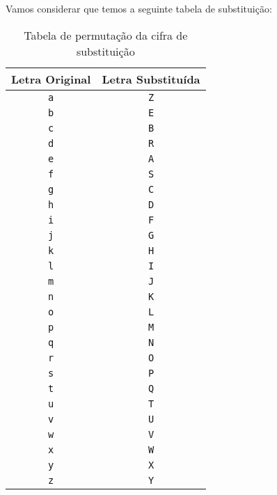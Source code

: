 \begin{example}

Vamos considerar que temos a seguinte tabela de substituição:
  
\begin{table}[h!]
\centering
\begin{tabular}{|c|c|}
\hline
\textbf{Letra Original} & \textbf{Letra Substituída} \\
\hline
\texttt{a} & \texttt{Z} \\
\hline
\texttt{b} & \texttt{E} \\
\hline
\texttt{c} & \texttt{B} \\
\hline
\texttt{d} & \texttt{R} \\
\hline
\texttt{e} & \texttt{A} \\
\hline
\texttt{f} & \texttt{S} \\
\hline
\texttt{g} & \texttt{C} \\
\hline
\texttt{h} & \texttt{D} \\
\hline
\texttt{i} & \texttt{F} \\
\hline
\texttt{j} & \texttt{G} \\
\hline
\texttt{k} & \texttt{H} \\
\hline
\texttt{l} & \texttt{I} \\
\hline
\texttt{m} & \texttt{J} \\
\hline
\texttt{n} & \texttt{K} \\
\hline
\texttt{o} & \texttt{L} \\
\hline
\texttt{p} & \texttt{M} \\
\hline
\texttt{q} & \texttt{N} \\
\hline
\texttt{r} & \texttt{O} \\
\hline
\texttt{s} & \texttt{P} \\
\hline
\texttt{t} & \texttt{Q} \\
\hline
\texttt{u} & \texttt{T} \\
\hline
\texttt{v} & \texttt{U} \\
\hline
\texttt{w} & \texttt{V} \\
\hline
\texttt{x} & \texttt{W} \\
\hline
\texttt{y} & \texttt{X} \\
\hline
\texttt{z} & \texttt{Y} \\
\hline
\end{tabular}
\caption{Tabela de permutação da cifra de substituição}
\label{table:substitution_cipher}
\end{table}


\end{example}
